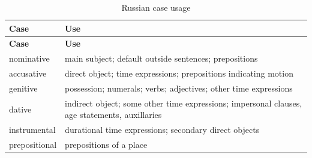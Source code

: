 \documentclass[
  a4paperpaper,
]{report}
\begin{document}
\begin{longtable}[]{@{}ll@{}}
\caption{Russian case usage}\tabularnewline
\toprule
\begin{minipage}[b]{0.13\columnwidth}\raggedright
\textbf{Case}\strut
\end{minipage} & \begin{minipage}[b]{0.81\columnwidth}\raggedright
\textbf{Use}\strut
\end{minipage}\tabularnewline
\midrule
\endfirsthead
\toprule
\begin{minipage}[b]{0.13\columnwidth}\raggedright
\textbf{Case}\strut
\end{minipage} & \begin{minipage}[b]{0.81\columnwidth}\raggedright
\textbf{Use}\strut
\end{minipage}\tabularnewline
\midrule
\endhead
\begin{minipage}[t]{0.13\columnwidth}\raggedright
nominative\strut
\end{minipage} & \begin{minipage}[t]{0.81\columnwidth}\raggedright
main subject; default outside sentences; prepositions\strut
\end{minipage}\tabularnewline
\begin{minipage}[t]{0.13\columnwidth}\raggedright
accusative\strut
\end{minipage} & \begin{minipage}[t]{0.81\columnwidth}\raggedright
direct object; time expressions; prepositions indicating motion\strut
\end{minipage}\tabularnewline
\begin{minipage}[t]{0.13\columnwidth}\raggedright
genitive\strut
\end{minipage} & \begin{minipage}[t]{0.81\columnwidth}\raggedright
possession; numerals; verbs; adjectives; other time expressions\strut
\end{minipage}\tabularnewline
\begin{minipage}[t]{0.13\columnwidth}\raggedright
dative\strut
\end{minipage} & \begin{minipage}[t]{0.81\columnwidth}\raggedright
indirect object; some other time expressions; impersonal clauses, age
statements, auxillaries\strut
\end{minipage}\tabularnewline
\begin{minipage}[t]{0.13\columnwidth}\raggedright
instrumental\strut
\end{minipage} & \begin{minipage}[t]{0.81\columnwidth}\raggedright
durational time expressions; secondary direct objects\strut
\end{minipage}\tabularnewline
\begin{minipage}[t]{0.13\columnwidth}\raggedright
prepositional\strut
\end{minipage} & \begin{minipage}[t]{0.81\columnwidth}\raggedright
prepositions of a place\strut
\end{minipage}\tabularnewline
\bottomrule
\end{longtable}
\end{document}
